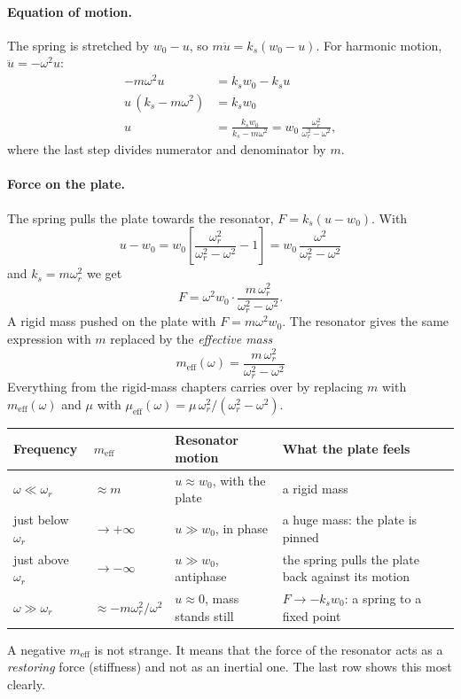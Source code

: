 \paragraph{Equation of motion.}
The spring is stretched by $w_0 - u$, so $m\ddot{u} = k_s(w_0 - u)$. For
harmonic motion, $\ddot{u} = -\omega^2 u$:
\begin{align}
  -m\omega^2 u &= k_s w_0 - k_s u \\
  u\,(k_s - m\omega^2) &= k_s w_0 \\
  u &= \frac{k_s w_0}{k_s - m\omega^2} = w_0\,\frac{\omega_r^2}{\omega_r^2 - \omega^2},
\end{align}
where the last step divides numerator and denominator by $m$.

\paragraph{Force on the plate.}
The spring pulls the plate towards the resonator, $F = k_s(u - w_0)$. With
\begin{equation}
  u - w_0 = w_0\left[\frac{\omega_r^2}{\omega_r^2 - \omega^2} - 1\right]
          = w_0\,\frac{\omega^2}{\omega_r^2 - \omega^2}
\end{equation}
and $k_s = m\omega_r^2$ we get
\begin{equation}
  F = \omega^2 w_0 \cdot \frac{m\,\omega_r^2}{\omega_r^2 - \omega^2} .
\end{equation}
A rigid mass pushed on the plate with $F = m\omega^2 w_0$. The resonator gives
the same expression with $m$ replaced by the \emph{effective mass}
\begin{equation}
  \boxed{\;m_\mathrm{eff}(\omega) = \frac{m\,\omega_r^2}{\omega_r^2 - \omega^2}\;}
\end{equation}
Everything from the rigid-mass chapters carries over by replacing $m$ with
$m_\mathrm{eff}(\omega)$ and $\mu$ with
$\mu_\mathrm{eff}(\omega) = \mu\,\omega_r^2/(\omega_r^2 - \omega^2)$.

\begin{center}
\begin{tabular}{|l|l|p{}|p{}|}
\hline
Frequency & $m_\mathrm{eff}$ & Resonator motion & What the plate feels \\
\hline
$\omega \ll \omega_r$ & $\approx m$ & $u \approx w_0$, with the plate & a rigid mass \\
just below $\omega_r$ & $\to +\infty$ & $u \gg w_0$, in phase & a huge mass: the plate is pinned \\
just above $\omega_r$ & $\to -\infty$ & $u \gg w_0$, antiphase & the spring pulls the plate back against its motion \\
$\omega \gg \omega_r$ & $\approx -m\omega_r^2/\omega^2$ & $u \approx 0$, mass stands still & $F \to -k_s w_0$: a spring to a fixed point \\
\hline
\end{tabular}
\end{center}
A negative $m_\mathrm{eff}$ is not strange. It means that the force of the
resonator acts as a \emph{restoring} force (stiffness) and not as an inertial
one. The last row shows this most clearly.

